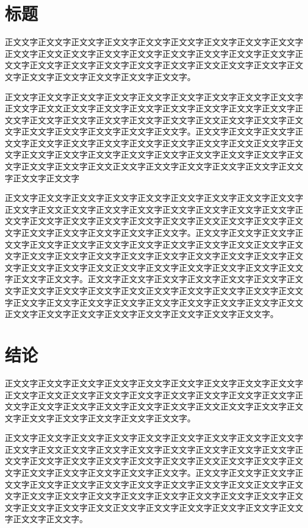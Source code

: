 \documentclass[twoside]{thesis-cls-Miya} %
\begin{document}
\chapter{标题}
正文文字正文文字正文文字正文文字正文文字正文文字正文文字正文文字正文文字正文文字正文文正文文字正文文字正文文字正文文字正文文字正文文字正文文字正文文字正文文字正文文字正文文字正文文字正文文字正文文正文文字正文文字正文文字正文文字正文文字正文文字正文文字正文文字。

正文文字正文文字正文文字正文文字正文文字正文文字正文文字正文文字正文文字正文文字正文文正文文字正文文字正文文字正文文字正文文字正文文字正文文字正文文字正文文字正文文字正文文字正文文字正文文字正文文正文文字正文文字正文文字正文文字正文文字正文文字正文文字正文文字。正文文字正文文字正文文字正文文字正文文字正文文字正文文字正文文字正文文字正文文字正文文正文文字正文文字正文文字正文文字正文文字正文文字正文文字正文文字正文文字正文文字正文文字正文文字正文文字正文文正文文字正文文字正文文字正文文字正文文字正文文字正文文字正文文字

正文文字正文文字正文文字正文文字正文文字正文文字正文文字正文文字正文文字正文文字正文文正文文字正文文字正文文字正文文字正文文字正文文字正文文字正文文字正文文字正文文字正文文字正文文字正文文字正文文正文文字正文文字正文文字正文文字正文文字正文文字正文文字正文文字。正文文字正文文字正文文字正文文字正文文字正文文字正文文字正文文字正文文字正文文字正文文正文文字正文文字正文文字正文文字正文文字正文文字正文文字正文文字正文文字正文文字正文文字正文文字正文文字正文文正文文字正文文字正文文字正文文字正文文字正文文字正文文字正文文字。正文文字正文文字正文文字正文文字正文文字正文文字正文文字正文文字正文文字正文文字正文文正文文字正文文字正文文字正文文字正文文字正文文字正文文字正文文字正文文字正文文字正文文字正文文字正文文字正文文正文文字正文文字正文文字正文文字正文文字正文文字正文文字正文文字。


\chapter{结论}
正文文字正文文字正文文字正文文字正文文字正文文字正文文字正文文字正文文字正文文字正文文正文文字正文文字正文文字正文文字正文文字正文文字正文文字正文文字正文文字正文文字正文文字正文文字正文文字正文文正文文字正文文字正文文字正文文字正文文字正文文字正文文字正文文字。

正文文字正文文字正文文字正文文字正文文字正文文字正文文字正文文字正文文字正文文字正文文正文文字正文文字正文文字正文文字正文文字正文文字正文文字正文文字正文文字正文文字正文文字正文文字正文文字正文文正文文字正文文字正文文字正文文字正文文字正文文字正文文字正文文字。正文文字正文文字正文文字正文文字正文文字正文文字正文文字正文文字正文文字正文文字正文文正文文字正文文字正文文字正文文字正文文字正文文字正文文字正文文字正文文字正文文字正文文字正文文字正文文字正文文正文文字正文文字正文文字正文文字正文文字正文文字正文文字正文文字。
\end{document}
